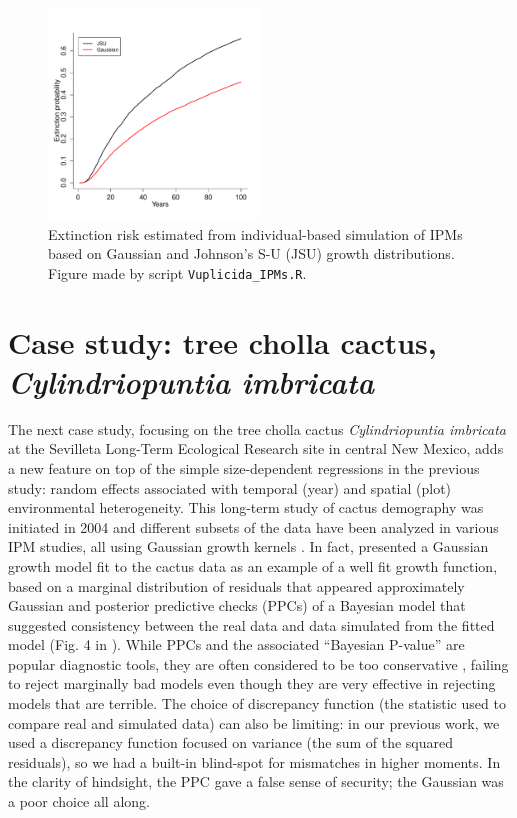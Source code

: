 \documentclass[12pt]{article}
\begin{document}
\begin{figure}[tbp]
	\centering
	\includegraphics[width=0.5\textwidth]{figures/lichen_extinction_risk}
	\caption{Extinction risk estimated from individual-based simulation of IPMs based on Gaussian and Johnson's S-U (JSU) growth distributions. Figure made by script \texttt{Vuplicida\_IPMs.R}.}
	\label{fig:lichen_extinction}
\end{figure} 

\section{Case study: tree cholla cactus, \emph{Cylindriopuntia imbricata}}
\label{sec:cactusCaseStudy} 
The next case study, focusing on the tree cholla cactus \emph{Cylindriopuntia imbricata} at the Sevilleta Long-Term Ecological Research site in central New Mexico, adds a new feature on top of the simple size-dependent regressions in the previous study: random effects associated with temporal (year) and spatial (plot) environmental heterogeneity. 
This long-term study of cactus demography was initiated in 2004 and different subsets of the data have been analyzed in various IPM studies, all using Gaussian growth kernels  \citep{miller2009impacts,czachurademographic,compagnoni2016effect,ohm2014balancing,elderd2016quantifying}.
In fact, \citep{elderd2016quantifying} presented a Gaussian growth model fit to the cactus data as an example of a well fit growth function, based on a marginal distribution of residuals that appeared approximately Gaussian and posterior predictive checks (PPCs) of a Bayesian model that suggested consistency between the real data and data simulated from the fitted model (Fig. 4 in \citep{elderd2016quantifying}). 
While PPCs and the associated ``Bayesian P-value'' are popular diagnostic tools, they are often considered to be too conservative \citep{conn2018guide,zhang2014comparative}, failing to reject marginally bad models even though they are very effective in rejecting models that are terrible.
The choice of discrepancy function (the statistic used to compare real and simulated data) can also be limiting: in our previous work, we used a discrepancy function focused on variance (the sum of the squared residuals), so we had a built-in blind-spot for mismatches in higher moments.
In the clarity of hindsight, the PPC gave a false sense of security; the Gaussian was a poor choice all along.
\end{document}
